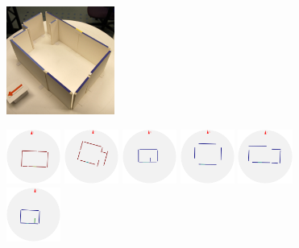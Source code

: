 \begin{figure}[t]
\begin{center}
\includegraphics[width=1.4in]{../gi2012_userstudy/images/photos/63_original} %
\begin{minipage}[b]{3.7in}
  \includegraphics[width=0.7in]{../gi2012_userstudy/images/section2/0_2D_walls_rotate} %
  \includegraphics[width=0.7in]{../gi2012_userstudy/images/section2/2_2D_walls_rotate} %
  \includegraphics[width=0.7in]{../gi2012_userstudy/images/section2/6_2D_walls_rotate}  %
  \includegraphics[width=0.7in]{../gi2012_userstudy/images/section2/7_2D_walls_rotate} %
  \includegraphics[width=0.7in]{../gi2012_userstudy/images/section2/8_2D_walls_rotate}\\ %
  \includegraphics[width=0.7in]{../gi2012_userstudy/images/section2/3_2D_walls_rotate} %

\end{minipage}
\end{center}
\end{figure}
